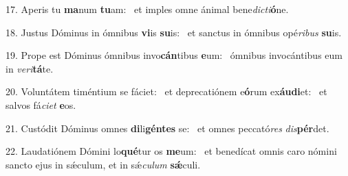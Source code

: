 17. Aperis tu \textbf{ma}num \textbf{tu}am: \ast\  et imples omne ánimal bene\textit{dic}\textit{ti}\textbf{ó}ne.\

18. Justus Dóminus in ómnibus \textbf{vi}is \textbf{su}is: \ast\  et sanctus in ómnibus opé\textit{ri}\textit{bus} \textbf{su}is.\

19. Prope est Dóminus ómnibus invo\textbf{cán}tibus \textbf{e}um: \ast\  ómnibus invocántibus eum in \textit{ve}\textit{ri}\textbf{tá}te.\

20. Voluntátem timéntium se fáciet: \dag\  et deprecatiónem e\textbf{ó}rum ex\textbf{áu}\textbf{di}et: \ast\  et salvos fá\textit{ci}\textit{et} \textbf{e}os.\

21. Custódit Dóminus omnes \textbf{di}li\textbf{gén}\textbf{tes} se: \ast\  et omnes peccató\textit{res} \textit{dis}\textbf{pér}det.\

22. Laudatiónem Dómini lo\textbf{qué}tur os \textbf{me}um: \ast\  et benedícat omnis caro nómini sancto ejus in sǽculum, et in sǽ\textit{cu}\textit{lum} \textbf{sǽ}culi.\

